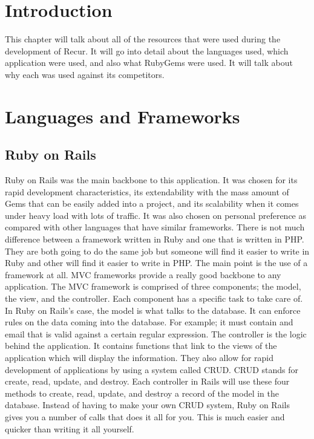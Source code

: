 \section{Introduction}
This chapter will talk about all of the resources that were used during the development of Recur. It will go into detail about the languages used, which application were used, and also what RubyGems were used. It will talk about why each was used against its competitors.

\section{Languages and Frameworks}
\subsection{Ruby on Rails}
Ruby on Rails was the main backbone to this application. It was chosen for its rapid development characteristics, its extendability with the mass amount of Gems that can be easily added into a project, and its scalability when it comes under heavy load with lots of traffic. It was also chosen on personal preference as compared with other languages that have similar frameworks. There is not much difference between a framework written in Ruby and one that is written in PHP. They are both going to do the same job but someone will find it easier to write in Ruby and other will find it easier to write in PHP. The main point is the use of a framework at all. MVC frameworks provide a really good backbone to any application. The MVC framework is comprised of three components; the model, the view, and the controller. Each component has a specific task to take care of. In Ruby on Rails's case, the model is what talks to the database. It can enforce rules on the data coming into the database. For example; it must contain and email that is valid against a certain regular expression. The controller is the logic behind the application. It contains functions that link to the views of the application which will display the information. They also allow for rapid development of applications by using a system called CRUD. CRUD stands for create, read, update, and destroy. Each controller in Rails will use these four methods to create, read, update, and destroy a record of the model in the database. Instead of having to make your own CRUD system, Ruby on Rails gives you a number of calls that does it all for you. This is much easier and quicker than writing it all yourself.\\


